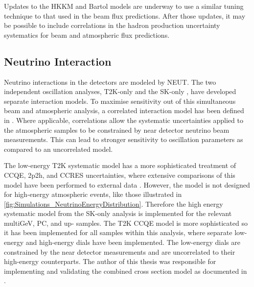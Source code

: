 Updates to the HKKM and Bartol models are underway \cite{Sato2022-ss} to use a similar tuning technique to that used in the beam flux predictions. After those updates, it may be possible to include correlations in the hadron production uncertainty systematics for beam and atmospheric flux predictions.

\subsection{Neutrino Interaction}
\label{sec:SelsAndSysts_Systs_Interaction}

Neutrino interactions in the detectors are modeled by NEUT. The two independent oscillation analyses, T2K-only \cite{t2k_tn_344} and the SK-only \cite{Kamiokande_Collaboration2017-nf}, have developed separate interaction models. To maximise sensitivity out of this simultaneous beam and atmospheric analysis, a correlated interaction model has been defined in \cite{t2k_tn_422}. Where applicable, correlations allow the systematic uncertainties applied to the atmospheric samples to be constrained by near detector neutrino beam measurements. This can lead to stronger sensitivity to oscillation parameters as compared to an uncorrelated model.

The low-energy T2K systematic model has a more sophisticated treatment of CCQE, 2p2h, and CCRES uncertainties, where extensive comparisons of this model have been performed to external data \cite{t2k_tn_344}. However, the model is not designed for high-energy atmospheric events, like those illustrated in \autoref{fig:Simulations_NeutrinoEnergyDistribution}. Therefore the high energy systematic model from the SK-only analysis is implemented for the relevant multiGeV, PC, and up-\quickmath{\mu} samples. The T2K CCQE model is more sophisticated so it has been implemented for all samples within this analysis, where separate low-energy and high-energy dials have been implemented. The low-energy dials are constrained by the near detector measurements and are uncorrelated to their high-energy counterparts. The author of this thesis was responsible for implementing and validating the combined cross section model as documented in \cite{t2k_tn_422, t2k_tn_426}.


